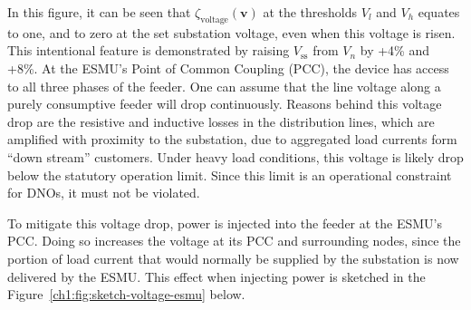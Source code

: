 

In this figure, it can be seen that $\zeta_\text{voltage}(\textbf{v})$ at the thresholds $V_l$ and $V_h$ equates to one, and to zero at the set substation voltage, even when this voltage is risen.
This intentional feature is demonstrated by raising $V_\text{ss}$ from $V_n$ by +4\% and +8\%.
At the ESMU's Point of Common Coupling (PCC), the device has access to all three phases of the feeder.
One can assume that the line voltage along a purely consumptive feeder will drop continuously.
Reasons behind this voltage drop are the resistive and inductive losses in the distribution lines, which are amplified with proximity to the substation, due to aggregated load currents form ``down stream'' customers.
Under heavy load conditions, this voltage is likely drop below the statutory operation limit.
Since this limit is an operational constraint for DNOs, it must not be violated.

To mitigate this voltage drop, power is injected into the feeder at the ESMU's PCC.
Doing so increases the voltage at its PCC and surrounding nodes, since the portion of load current that would normally be supplied by the substation is now delivered by the ESMU.
This effect when injecting power is sketched in the Figure~\ref{ch1:fig:sketch-voltage-esmu} below.




